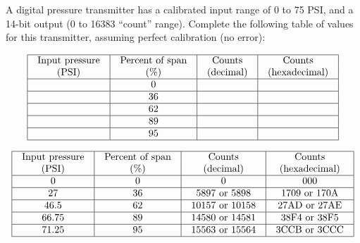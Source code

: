

A digital pressure transmitter has a calibrated input range of 0 to 75 PSI, and a 14-bit output (0 to 16383 ``count'' range).  Complete the following table of values for this transmitter, assuming perfect calibration (no error):


$$\vbox{\offinterlineskip
\halign{\strut
\vrule \quad\hfil # \ \hfil & 
\vrule \quad\hfil # \ \hfil & 
\vrule \quad\hfil # \ \hfil & 
\vrule \quad\hfil # \ \hfil \vrule \cr
\noalign{\hrule}
%
Input pressure & Percent of span & Counts & Counts \cr
%
(PSI) & (\%) & (decimal) & (hexadecimal) \cr
%
\noalign{\hrule}
%
 & 0 &  & \cr
%
\noalign{\hrule}
%
 & 36 &  & \cr
%
\noalign{\hrule}
%
 & 62 &  & \cr
%
\noalign{\hrule}
%
 & 89 &  &  \cr
%
\noalign{\hrule}
%
 & 95 &  &  \cr
%
\noalign{\hrule}
} %
}$$ %








$$\vbox{\offinterlineskip
\halign{\strut
\vrule \quad\hfil # \ \hfil & 
\vrule \quad\hfil # \ \hfil & 
\vrule \quad\hfil # \ \hfil & 
\vrule \quad\hfil # \ \hfil \vrule \cr
\noalign{\hrule}
%
Input pressure & Percent of span & Counts & Counts \cr
%
(PSI) & (\%) & (decimal) & (hexadecimal) \cr
%
\noalign{\hrule}
%
0 & 0 & 0 & 000 \cr
%
\noalign{\hrule}
%
27 & 36 & 5897 or 5898 & 1709 or 170A \cr
%
\noalign{\hrule}
%
46.5 & 62 & 10157 or 10158 & 27AD or 27AE \cr
%
\noalign{\hrule}
%
66.75 & 89 & 14580 or 14581 & 38F4 or 38F5 \cr
%
\noalign{\hrule}
%
71.25 & 95 & 15563 or 15564 & 3CCB or 3CCC \cr
%
\noalign{\hrule}
} %
}$$ %












